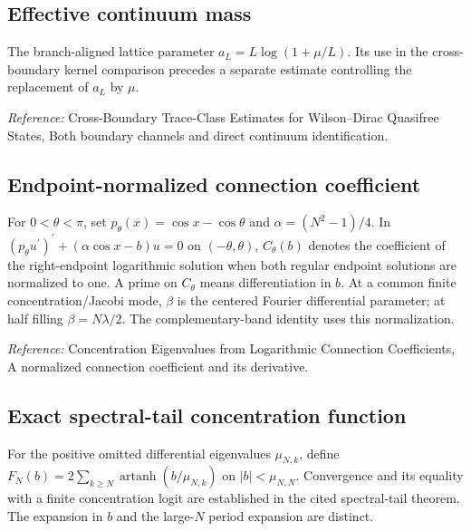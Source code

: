 \documentclass[
  10pt,
  a4paper,
]{article}
\begin{document}
\subsection{Effective continuum mass}\label{effective-continuum-mass}

The branch-aligned lattice parameter \(a_L=L\log(1+\mu/L)\). Its use in the cross-boundary kernel comparison precedes a separate estimate controlling the replacement of \(a_L\) by \(\mu\).

\nopagebreak[4]

\emph{Reference:} Cross-Boundary Trace-Class Estimates for Wilson--Dirac Quasifree States, Both boundary channels and direct continuum identification.

\subsection{Endpoint-normalized connection coefficient}\label{endpoint-normalized-connection-coefficient}

For \(0<\theta<\pi\), set \(p_\theta(x)=\cos x-\cos\theta\) and \(\alpha=(N^2-1)/4\). In \((p_\theta u^{\prime})^{\prime}+(\alpha\cos x-b)u=0\) on \((-\theta,\theta)\), \(C_\theta(b)\) denotes the coefficient of the right-endpoint logarithmic solution when both regular endpoint solutions are normalized to one. A prime on \(C_\theta\) means differentiation in \(b\). At a common finite concentration/Jacobi mode, \(\beta\) is the centered Fourier differential parameter; at half filling \(\beta=N\lambda/2\). The complementary-band identity uses this normalization.

\nopagebreak[4]

\emph{Reference:} Concentration Eigenvalues from Logarithmic Connection Coefficients, A normalized connection coefficient and its derivative.

\subsection{Exact spectral-tail concentration function}\label{exact-spectral-tail-concentration-function}

For the positive omitted differential eigenvalues \(\mu_{N,k}\), define \(F_N(b)=2\sum_{k\ge N}\operatorname{artanh}(b/\mu_{N,k})\) on \(|b|<\mu_{N,N}\). Convergence and its equality with a finite concentration logit are established in the cited spectral-tail theorem. The expansion in \(b\) and the large-\(N\) period expansion are distinct.

\nopagebreak[4]
\end{document}
